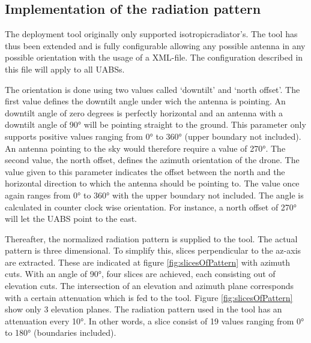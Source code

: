 \subsection{Implementation of the radiation pattern}
\label{subsec:implementationradpat}
The deployment tool originally only supported \gls{isotropicradiator}'s. The tool has thus been extended and is fully configurable allowing any possible antenna 
in any possible 
orientation with the usage of a XML-file. The configuration described in this file will apply to all \gls{UABS}s. 

The orientation is done using two values called `downtilt' and `north offset'. The first value
defines the downtilt angle under wich the antenna is pointing. An downtilt angle of zero degrees is perfectly horizontal and 
an antenna with a downtilt angle of \ang{90} will be pointing straight to the ground.
This parameter only supports positive values ranging from \ang{0} to \ang{360} (upper boundary not included). An antenna pointing to the sky would therefore require a value of \ang{270}.
The second value, the north offset, defines the azimuth orientation of the drone. The value given to this parameter indicates the offset between the north
and the horizontal direction to which the antenna should be pointing to. The value once again ranges from \ang{0} to \ang{360} with the upper boundary not included. The
angle is calculated in counter clock wise orientation. For instance, a north offset of \ang{270} will let the \gls{UABS} point to the east.  

Thereafter, the normalized radiation pattern is supplied to the tool. The actual pattern is three dimensional. To simplify this,
slices perpendicular to the az-axis are extracted. These are indicated at figure \ref{fig:slicesOfPattern} with azimuth cuts. With
an angle of \ang{90}, four slices are achieved, each consisting out of elevation cuts. The intersection of an elevation and azimuth plane 
corresponds with a certain attenuation which is fed to the tool. Figure \ref{fig:slicesOfPattern} show only 3 elevation planes. The radiation pattern used in the tool 
has an attenuation every \ang{10}. In other words, a slice consist of 19 values ranging from \ang{0} to \ang{180} (boundaries included).


